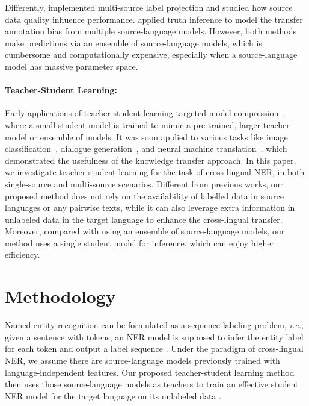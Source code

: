 \documentclass[11pt,a4paper]{article}
\newcommand\ie{\textit{i.e.}}
\begin{document}
	Differently, \citet{enghoff2018low} implemented multi-source label projection and studied how source data quality influence performance. 
	\citet{rahimi2019massively} applied truth inference to model the transfer annotation bias from multiple source-language models. However, both methods make predictions via an ensemble of source-language models, which is cumbersome and computationally expensive, especially when a source-language model has massive parameter space.
	
	\paragraph{Teacher-Student Learning: }
	Early applications of teacher-student learning targeted model compression~\cite{bucilu2006model}, where a small student model is trained to mimic a pre-trained, larger teacher model or ensemble of models. It was soon applied to various tasks like image classification~\cite{hinton2015distilling,you2017learning}, dialogue generation~\cite{peng2019teacher}, and neural machine translation~\cite{tan2019multilingual}, which demonstrated the usefulness of the knowledge transfer approach.
\newline
	\newline
	In this paper, we investigate teacher-student learning for the task of cross-lingual NER, in both single-source and multi-source scenarios. Different from previous works, our proposed method does not rely on the availability of labelled data in source languages or any pairwise texts, while it can also leverage extra information in unlabeled data in the target language to enhance the cross-lingual transfer. Moreover, compared with using an ensemble of source-language models, our method uses a single student model for inference, which can enjoy higher efficiency.
	


	\section{Methodology}
	Named entity recognition can be formulated as a sequence labeling problem, \ie, given a sentence  with  tokens, an NER model is supposed to infer the entity label  for each token  and output a label sequence . 
	Under the paradigm of cross-lingual NER, we assume there are  source-language models previously trained with language-independent features. Our proposed teacher-student learning method then uses those  source-language models as teachers to train an effective student NER model for the target language on its unlabeled data . 
\end{document}
